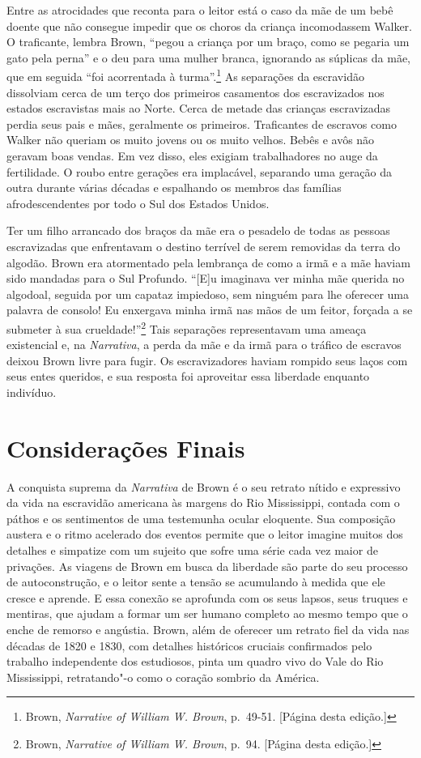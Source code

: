 Entre as atrocidades que reconta para o leitor está o caso da mãe de um
bebê doente que não consegue impedir que os choros da criança
incomodassem Walker. O traficante, lembra Brown, ``pegou a criança por
um braço, como se pegaria um gato pela perna'' e o deu para uma mulher
branca, ignorando as súplicas da mãe, que em seguida ``foi acorrentada à
turma''.\footnote{Brown, \emph{Narrative of William W. Brown}, p.~49-51.
  {[}Página \pageref{ref9} desta edição.{]}} As separações da escravidão dissolviam
cerca de um terço dos primeiros casamentos dos escravizados nos estados
escravistas mais ao Norte. Cerca de metade das crianças escravizadas
perdia seus pais e mães, geralmente os primeiros. Traficantes de
escravos como Walker não queriam os muito jovens ou os muito velhos.
Bebês e avôs não geravam boas vendas. Em vez disso, eles exigiam
trabalhadores no auge da fertilidade. O roubo entre gerações era
implacável, separando uma geração da outra durante várias décadas e
espalhando os membros das famílias afrodescendentes por todo o Sul dos
Estados Unidos.

Ter um filho arrancado dos braços da mãe era o pesadelo de todas as
pessoas escravizadas que enfrentavam o destino terrível de serem
removidas da terra do algodão. Brown era atormentado pela lembrança de
como a irmã e a mãe haviam sido mandadas para o Sul Profundo. ``{[}E{]}u
imaginava ver minha mãe querida no algodoal, seguida por um capataz
impiedoso, sem ninguém para lhe oferecer uma palavra de consolo! Eu
enxergava minha irmã nas mãos de um feitor, forçada a se submeter à sua
crueldade!''\footnote{Brown, \emph{Narrative of William W. Brown}, p.~94.
  {[}Página \pageref{ref10} desta edição.{]}} Tais separações representavam uma
ameaça existencial e, na \emph{Narrativa}, a perda da mãe e da irmã para
o tráfico de escravos deixou Brown livre para fugir. Os escravizadores
haviam rompido seus laços com seus entes queridos, e sua resposta foi
aproveitar essa liberdade enquanto indivíduo.

\section{Considerações Finais}

A conquista suprema da \emph{Narrativa} de Brown é o seu retrato nítido
e expressivo da vida na escravidão americana às margens do Rio
Mississippi, contada com o páthos e os sentimentos de uma testemunha
ocular eloquente. Sua composição austera e o ritmo acelerado dos eventos
permite que o leitor imagine muitos dos detalhes e simpatize com um
sujeito que sofre uma série cada vez maior de privações. As viagens de
Brown em busca da liberdade são parte do seu processo de autoconstrução,
e o leitor sente a tensão se acumulando à medida que ele cresce e
aprende. E essa conexão se aprofunda com os seus lapsos, seus truques e
mentiras, que ajudam a formar um ser humano completo ao mesmo tempo que
o enche de remorso e angústia. Brown, além de oferecer um retrato fiel
da vida nas décadas de 1820 e 1830, com detalhes históricos cruciais
confirmados pelo trabalho independente dos estudiosos, pinta um quadro
vivo do Vale do Rio Mississippi, retratando"-o como o coração sombrio da
América.
